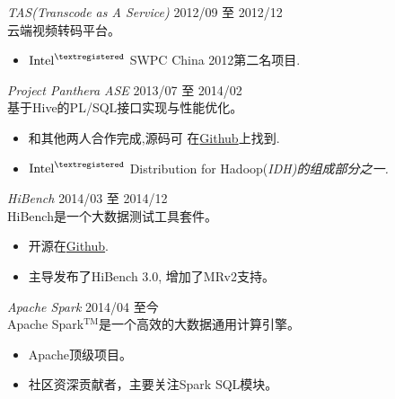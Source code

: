 \documentclass[line,margin]{res}
\begin{document}
\begin{resume}
                {\sl TAS(Transcode as A Service)} \hfill        2012/09 至 2012/12\\
                云端视频转码平台。
                  \begin{itemize}
                   \item $\textrm{Intel}^{\textregistered}$ SWPC China 2012第二名项目.
                   \end{itemize}
                   
                {\sl Project Panthera ASE} \hfill            2013/07 至 2014/02 \\
                基于Hive的PL/SQL接口实现与性能优化。
                 \begin{itemize}  \itemsep -2pt %
                 \item 和其他两人合作完成,源码可
                     在\href{https://github.com/intel-hadoop/project-panthera}{Github}上找到.
                 \item $\textrm{Intel}^{\textregistered}$ Distribution for Hadoop(\sl IDH)的组成部分之一.
                 \end{itemize}

                {\sl HiBench} \hfill        2014/03 至 2014/12 \\
                HiBench是一个大数据测试工具套件。
                  \begin{itemize}
                   \item 开源在\href{https://github.com/intel-hadoop/HiBench}{Github}.
                   \item 主导发布了HiBench 3.0, 增加了MRv2支持。
                   \end{itemize}

                {\sl Apache Spark} \hfill        2014/04 至今\\
                Apache Spark$^{\textrm{TM}}$是一个高效的大数据通用计算引擎。
                  \begin{itemize}
                   \item Apache顶级项目。
                   \item 社区资深贡献者，主要关注Spark SQL模块。
                   \end{itemize}
                   

\end{resume}
\end{document}
